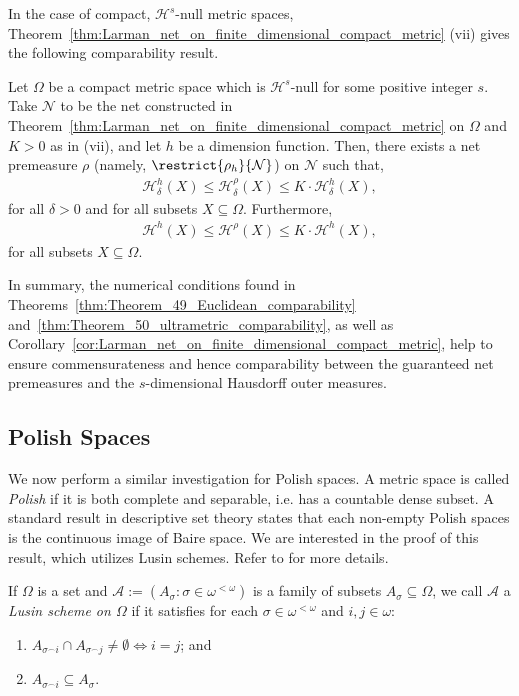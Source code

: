 In the case of compact, $\mathcal{H}^s$-null metric spaces, Theorem~\ref{thm:Larman_net_on_finite_dimensional_compact_metric} (vii) gives the following comparability result. 

\begin{corollary}
    \label{cor:Larman_net_on_finite_dimensional_compact_metric}
    Let $\Omega$ be a compact metric space which is $\mathcal{H}^s$-null for some positive integer $s$. Take $\mathcal{N}$ to be the net constructed in Theorem~\ref{thm:Larman_net_on_finite_dimensional_compact_metric} on $\Omega$ and $K > 0$ as in (vii), and let $h$ be a dimension function. Then, there exists a net premeasure $\rho$ (namely, $\restrict{\rho_h}{\mathcal{N}}$) on $\mathcal{N}$ such that,
    \begin{align*}
        \mathcal{H}^h_\delta(X) \leq \mathcal{H}^\rho_\delta(X) \leq K \cdot \mathcal{H}^h_{\delta} (X),
    \end{align*}
    for all $\delta > 0$ and for all subsets $X \subseteq \Omega$. Furthermore,
    \begin{align*}
        \mathcal{H}^h(X) \leq \mathcal{H}^\rho(X) \leq K \cdot \mathcal{H}^h (X),
    \end{align*}
    for all subsets $X \subseteq \Omega$.
\end{corollary}

In summary, the numerical conditions found in Theorems~\ref{thm:Theorem_49_Euclidean_comparability} and~\ref{thm:Theorem_50_ultrametric_comparability}, as well as Corollary~\ref{cor:Larman_net_on_finite_dimensional_compact_metric}, help to ensure commensurateness and hence comparability between the guaranteed net premeasures and the $s$-dimensional Hausdorff outer measures.

\subsection{Polish Spaces}

We now perform a similar investigation for Polish spaces. A metric space is called \textit{Polish} if it is both complete and separable, i.e. has a countable dense subset. A standard result in descriptive set theory states that each non-empty Polish spaces is the continuous image of Baire space. We are interested in the proof of this result, which utilizes Lusin schemes. Refer to \cite{Kec95} for more details. 

\begin{definition}
    \label{definition:Lusin_scheme}
    If $\Omega$ is a set and $\mathcal{A} := (A_\sigma : \sigma \in \omega^{<\omega})$ is a family of subsets $A_\sigma \subseteq \Omega$, we call $\mathcal{A}$ a \textit{Lusin scheme on $\Omega$} if it satisfies for each $\sigma \in \omega^{<\omega}$ and $i, j \in \omega$:
    \begin{enumerate}[label = (\roman*)]
        \item $A_{\sigma ^\frown i} \cap A_{\sigma ^\frown j} \neq \emptyset \iff i = j$; and
        \item $A_{\sigma ^\frown i} \subseteq A_\sigma$.
    \end{enumerate}
\end{definition}

